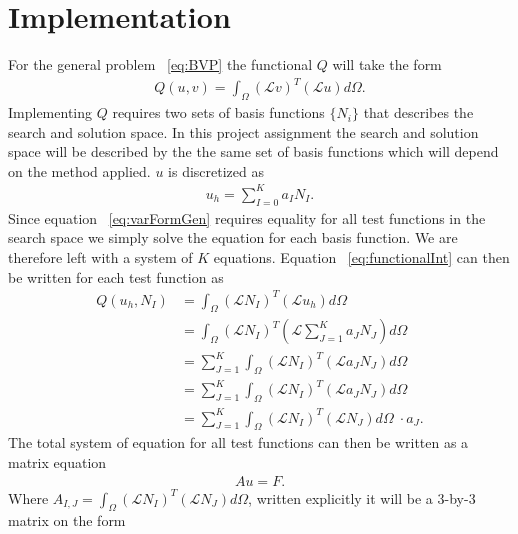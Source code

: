 
\chapter{Implementation} %

\label{chap:Implementation} %



 For the general problem ~\ref{eq:BVP} the functional $Q$ will take the form 
\begin{align}
	Q(u,v)=\int_{\Omega}(\mathcal{L}v)^T(\mathcal{L}u)d\Omega.
	\label{eq:functionalInt}
\end{align}
Implementing $Q$ requires two sets of basis functions $\{N_i\}$ that describes the search and solution space. In this project assignment the search and solution space will be described by the the same set of basis functions which will depend on the method applied. $u$ is discretized as 
\begin{align}
	u_h = \sum_{I=0}^{K}a_IN_I.
	\label{eq:uDisc}
\end{align}
Since equation ~\ref{eq:varFormGen} requires equality for all test functions in the search space we simply solve the equation for each basis function. We are therefore left with a system of $K$ equations. Equation ~\ref{eq:functionalInt} can then be written for each test function as  
\begin{align}
	Q(u_h,N_I) &= \int_{\Omega}(\mathcal{L}N_I)^T(\mathcal{L}u_h)d\Omega \\
	&= \int_{\Omega}(\mathcal{L}N_I)^T(\mathcal{L}\sum_{J=1}^Ka_JN_J)d\Omega \\
	&= \sum_{J=1}^K\int_{\Omega}(\mathcal{L}N_I)^T(\mathcal{L}a_JN_J)d\Omega \\
	&= \sum_{J=1}^K\int_{\Omega}(\mathcal{L}N_I)^T(\mathcal{L}a_JN_J)d\Omega \\
	&= \sum_{J=1}^K\int_{\Omega}(\mathcal{L}N_I)^T(\mathcal{L}N_J)d\Omega \;\cdot a_J.
	\label{eq:varFormDisc}
\end{align}
The total system of equation for all test functions can then be written as a matrix equation 
\begin{align}
	Au = F.
	\label{eq:matrixEq}
\end{align}
Where $A_{I,J}=\int_{\Omega}(\mathcal{L}N_I)^T(\mathcal{L}N_J)d\Omega$, written explicitly it will be a 3-by-3 matrix on the form 

